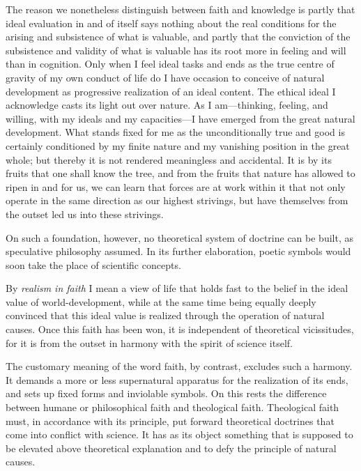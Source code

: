 \documentclass[12pt,a4paper]{article}
\newcommand{\opage}[1]{\marginnote{\footnotesize\textit{[#1]}}}
\begin{document}
The reason we nonetheless distinguish between faith and knowledge is
partly that ideal evaluation in and of itself says \opage{11}nothing about the real
conditions for the arising and subsistence of what is valuable, and partly
that the conviction of the subsistence and validity of what is valuable
has its root more in feeling and will than in cognition. Only when I feel
ideal tasks and ends as the true centre of gravity of my own conduct of
life do I have occasion to conceive of natural development as progressive
realization of an ideal content. The ethical ideal I acknowledge casts its
light out over nature. As I am---thinking, feeling, and willing, with my
ideals and my capacities---I have emerged from the great natural
development. What stands fixed for me as the unconditionally true and good
is certainly conditioned by my finite nature and my vanishing position in
the great whole; but thereby it is not rendered meaningless and
accidental. It is by its fruits that one shall know the tree, and from the
fruits that nature has allowed to ripen in and for us, we can learn that
forces are at work within it that not only operate in the same direction
as our highest strivings, but have themselves from the outset led us into
these strivings.

On such a foundation, however, no theoretical system of doctrine can be
built, as speculative philosophy assumed. In its further elaboration,
poetic symbols would soon take the place of scientific concepts.

By \emph{realism in faith} I mean a view of life that holds fast to the belief
in the ideal value of world-development, while at the same time being
equally deeply convinced that this ideal value is realized through the
operation of natural causes. Once this faith has been won, it is
independent of theoretical vicissitudes, for it is from the outset in
harmony with the spirit of science itself.

The customary meaning of the word faith, by contrast, excludes such a
harmony. It demands a more or less supernatural apparatus for the
realization of its ends, and sets up fixed forms and inviolable symbols.
On this rests the difference between humane or philosophical faith and
theological faith. Theological faith must, in accordance with its
principle, put forward theoretical doctrines that come into conflict with
science. It has as its object something that is supposed to be \opage{12}elevated
above theoretical explanation and to defy the principle of natural causes.
\end{document}
